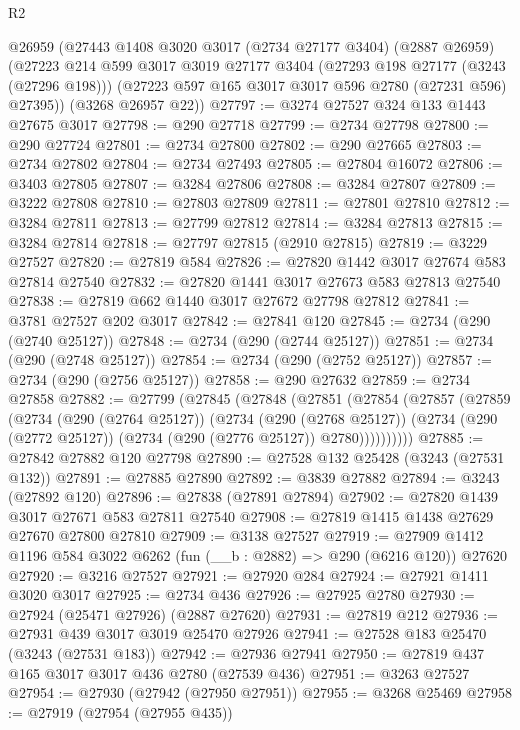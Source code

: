 \begin{lexlean}{R2}
\begin{coremodule}
    @26959
    (@27443
      @1408
      @3020
      @3017
      (@2734 @27177 @3404)
      (@2887 @26959)
      (@27223
        @214
        @599
        @3017
        @3019
        @27177
        @3404
        (@27293 @198 @27177 (@3243 (@27296 @198)))
        (@27223 @597 @165 @3017 @3017 @596 @2780 (@27231 @596) @27395))
      (@3268 @26957 @22))
@27797 := @3274 @27527 @324 @133 @1443 @27675 @3017
@27798 := @290 @27718
@27799 := @2734 @27798
@27800 := @290 @27724
@27801 := @2734 @27800
@27802 := @290 @27665
@27803 := @2734 @27802
@27804 := @2734 @27493
@27805 := @27804 @16072
@27806 := @3403 @27805
@27807 := @3284 @27806
@27808 := @3284 @27807
@27809 := @3222 @27808
@27810 := @27803 @27809
@27811 := @27801 @27810
@27812 := @3284 @27811
@27813 := @27799 @27812
@27814 := @3284 @27813
@27815 := @3284 @27814
@27818 := @27797 @27815 (@2910 @27815)
@27819 := @3229 @27527
@27820 := @27819 @584
@27826 := @27820 @1442 @3017 @27674 @583 @27814 @27540
@27832 := @27820 @1441 @3017 @27673 @583 @27813 @27540
@27838 := @27819 @662 @1440 @3017 @27672 @27798 @27812
@27841 := @3781 @27527 @202 @3017
@27842 := @27841 @120
@27845 := @2734 (@290 (@2740 @25127))
@27848 := @2734 (@290 (@2744 @25127))
@27851 := @2734 (@290 (@2748 @25127))
@27854 := @2734 (@290 (@2752 @25127))
@27857 := @2734 (@290 (@2756 @25127))
@27858 := @290 @27632
@27859 := @2734 @27858
@27882 := @27799
    (@27845
      (@27848
        (@27851
          (@27854
            (@27857
              (@27859
                (@2734
                  (@290 (@2764 @25127))
                  (@2734
                    (@290 (@2768 @25127))
                    (@2734 (@290 (@2772 @25127)) (@2734 (@290 (@2776 @25127)) @2780))))))))))
@27885 := @27842 @27882 @120 @27798
@27890 := @27528 @132 @25428 (@3243 (@27531 @132))
@27891 := @27885 @27890
@27892 := @3839 @27882
@27894 := @3243 (@27892 @120)
@27896 := @27838 (@27891 @27894)
@27902 := @27820 @1439 @3017 @27671 @583 @27811 @27540
@27908 := @27819 @1415 @1438 @27629 @27670 @27800 @27810
@27909 := @3138 @27527
@27919 := @27909 @1412 @1196 @584 @3022 @6262 (fun (__b : @2882) => @290 (@6216 @120)) @27620
@27920 := @3216 @27527
@27921 := @27920 @284
@27924 := @27921 @1411 @3020 @3017
@27925 := @2734 @436
@27926 := @27925 @2780
@27930 := @27924 (@25471 @27926) (@2887 @27620)
@27931 := @27819 @212
@27936 := @27931 @439 @3017 @3019 @25470 @27926
@27941 := @27528 @183 @25470 (@3243 (@27531 @183))
@27942 := @27936 @27941
@27950 := @27819 @437 @165 @3017 @3017 @436 @2780 (@27539 @436)
@27951 := @3263 @27527
@27954 := @27930 (@27942 (@27950 @27951))
@27955 := @3268 @25469
@27958 := @27919 (@27954 (@27955 @435))

\end{coremodule}
\end{lexlean}

